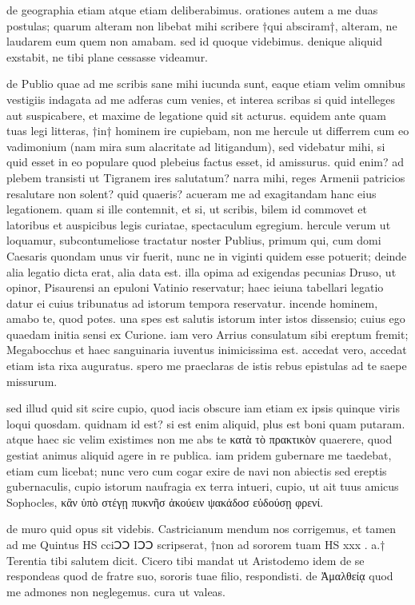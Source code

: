 


 de geographia etiam atque etiam deliberabimus. orationes autem a me duas postulas; quarum alteram non libebat mihi scribere †qui absciram†, alteram, ne laudarem eum quem non amabam. sed id quoque videbimus. denique aliquid exstabit, ne tibi plane cessasse videamur.

 de Publio quae ad me scribis sane mihi iucunda sunt, eaque etiam velim omnibus vestigiis indagata ad me adferas cum venies, et interea scribas si quid intelleges aut suspicabere, et maxime de legatione quid sit acturus. equidem ante quam tuas legi litteras, †in† hominem ire cupiebam, non me hercule ut differrem cum eo vadimonium (nam mira sum alacritate ad litigandum), sed videbatur mihi, si quid esset in eo populare quod plebeius factus esset, id amissurus. quid enim? ad plebem transisti ut Tigranem ires salutatum? narra mihi, reges Armenii patricios resalutare non solent? quid quaeris? acueram me ad exagitandam hanc eius legationem. quam si ille contemnit, et si, ut scribis, bilem id commovet et latoribus et auspicibus legis curiatae, spectaculum egregium. hercule verum ut loquamur, subcontumeliose tractatur noster Publius, primum qui, cum domi Caesaris quondam unus vir fuerit, nunc ne in viginti quidem esse potuerit; deinde alia legatio dicta erat, alia data est. illa opima ad exigendas pecunias Druso, ut opinor, Pisaurensi an epuloni Vatinio reservatur; haec ieiuna tabellari legatio datur ei cuius tribunatus ad istorum tempora reservatur. incende hominem, amabo te, quod potes. una spes est salutis istorum inter istos dissensio; cuius ego quaedam initia sensi ex Curione. iam vero Arrius consulatum sibi ereptum fremit; Megabocchus et haec sanguinaria iuventus inimicissima est. accedat vero, accedat etiam ista rixa auguratus. spero me praeclaras de istis rebus epistulas ad te saepe missurum.

 sed illud quid sit scire cupio, quod iacis obscure iam etiam ex ipsis quinque viris loqui quosdam. quidnam id est? si est enim aliquid, plus est boni quam putaram. atque haec sic velim existimes non me abs te κατὰ τὸ πρακτικὸν quaerere, quod gestiat animus aliquid agere in re publica. iam pridem gubernare me taedebat, etiam cum licebat; nunc vero cum cogar exire de navi non abiectis sed ereptis gubernaculis, cupio istorum naufragia ex terra intueri, cupio, ut ait tuus amicus Sophocles, κἂν ὑπὸ στέγῃ πυκνῆσ ἀκούειν ψακάδοσ εὑδούσῃ φρενί.

 de muro quid opus sit videbis. Castricianum mendum nos corrigemus, et tamen ad me Quintus HS cciↃↃ IↃↃ scripserat, †non ad sororem tuam HS xxx . a.† Terentia tibi salutem dicit. Cicero tibi mandat ut Aristodemo idem de se respondeas quod de fratre suo, sororis tuae filio, respondisti. de Ἀμαλθείᾳ quod me admones non neglegemus. cura ut valeas.
